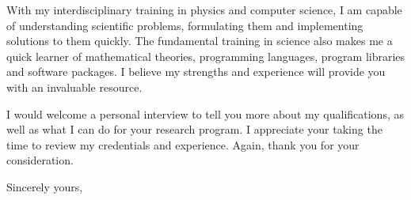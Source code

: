\documentclass{letter} %
\begin{document}
\begin{letter}{}
With my interdisciplinary training in physics and computer science, I am capable of understanding scientific problems, formulating them and implementing solutions to them quickly. The fundamental training in science also makes me a quick learner of mathematical theories, programming languages, program libraries and software packages. I believe my strengths and experience will provide you with an invaluable resource.

\noindent %
I would welcome a personal interview to tell you more about my qualifications, as well as what I can do for your research program. I appreciate your taking the time to review my credentials and experience. Again, thank you for your consideration. 
 
\closing{Sincerely yours,} 
 

 

\end{letter}
 
\end{document}
